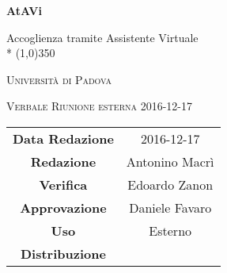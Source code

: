 \documentclass[a4paper,12pt]{article}
\author{Daniele Favaro}
\date{18/12/2016}
\begin{document}
\begin{titlepage}
	\centering
	{\huge\bfseries AtAVi\par}
	Accoglienza tramite Assistente Virtuale \\*
	\line(1,0){350} \\
	{\scshape\LARGE Università di Padova \par}
	\vspace{1cm}
	{\scshape\Large Verbale Riunione esterna 2016-12-17\par}
	\vspace{1.5cm}
	\logo
	\vspace{2cm}	
	\vfill \vfill
	\begin{tabular}{c|c}
		{\hfill\textbf{Data Redazione}} 		& 2016-12-17		\\
		{\hfill\textbf{Redazione}} 			& Antonino Macrì \\
		{\hfill\textbf{Verifica}} 				& Edoardo Zanon 	\\
		{\hfill\textbf{Approvazione}} 				& Daniele Favaro 	\\
		{\hfill\textbf{Uso}} 					& Esterno			\\
		{\hfill\textbf{Distribuzione}} 		& \kpanic\			\\
	\end{tabular}
\end{titlepage}

	\pagestyle{myfront}
	\newpage
	\tableofcontents
	
	\label{LastFrontPage}
	\newpage
	\pagestyle{mymain}
		
		
		
		
		
	
	\label{LastPage}
\end{document}

